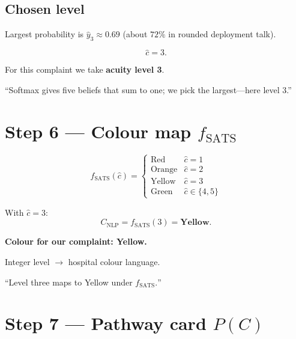 \subsection*{Chosen level}

Largest probability is \(\hat{y}_3 \approx 0.69\) (about \(72\%\) in rounded deployment talk).

\[
  \hat{c} = 3.
\]

\begin{resultbox}
For this complaint we take \textbf{acuity level 3}.
\end{resultbox}

\begin{saybox}
``Softmax gives five beliefs that sum to one; we pick the largest---here level 3.''
\end{saybox}

\section{Step 6 --- Colour map \(f_{\mathrm{SATS}}\)}
\label{sec:colour}

\[
  f_{\mathrm{SATS}}(\hat{c}) =
  \begin{cases}
    \mathrm{Red} & \hat{c}=1 \\
    \mathrm{Orange} & \hat{c}=2 \\
    \mathrm{Yellow} & \hat{c}=3 \\
    \mathrm{Green} & \hat{c}\in\{4,5\}
  \end{cases}
\]

With \(\hat{c}=3\):
\[
  C_{\mathrm{NLP}} = f_{\mathrm{SATS}}(3) = \mathbf{Yellow}.
\]

\begin{resultbox}
\textbf{Colour for our complaint: Yellow.}
\end{resultbox}

\begin{stepbox}
Integer level \(\to\) hospital colour language.
\end{stepbox}

\begin{saybox}
``Level three maps to Yellow under \(f_{\mathrm{SATS}}.\)''
\end{saybox}

\section{Step 7 --- Pathway card \(P(C)\)}
\label{sec:path}

